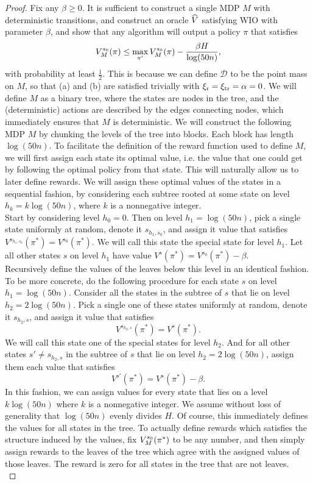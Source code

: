 \documentclass[11pt,twoside]{article}
\begin{document}
\noindent \begin{proof}
Fix any $\beta \geq 0$. It is sufficient to construct a single MDP $M$ with deterministic transitions, and construct an oracle $\widehat{V}$ satisfying WIO with parameter $\beta$, and show that any algorithm will output a policy $\pi$ that satisfies
$$
V^{{s_0 }}_{{M }}({\pi}) \leq \max_{\pi'} V^{{s_0 }}_{{M }}({\pi}) - \frac{\beta H}{\log(50n)},
$$
with probability at least $\frac{1}{2}$. This is because we can define $\mathcal{D}$ to be the point mass on $M$, so that \strprox{} (a) and (b) are satisfied trivially with $\operatorname{\xi_r} = \operatorname{\xi_{tr}} = \operatorname{\alpha} = 0$. We will define $M$ as a binary tree, where the states are nodes in the tree, and the (deterministic) actions are described by the edges connecting nodes, which immediately ensures that $M$ is deterministic. We will construct the following MDP $M$ by chunking the levels of the tree into blocks. Each block has length $\log(50n)$. To facilitate the definition of the reward function used to define $M$, we will first assign each state its optimal value, i.e. the value that one could get by following the optimal policy from that state. This will naturally allow us to later define rewards. We will assign these optimal values of the states in a sequential fashion, by considering each subtree rooted at some state on level $h_k = k \log(50n)$, where $k$ is a nonnegative integer. \\

\noindent Start by considering level $h_0 = 0$. Then on level $h_1 = \log(50n)$, pick a single state uniformly at random, denote it $s_{h_1, s_0}$, and assign it value that satisfies $V^{s_{h_1, s_0}}(\pi^*) = V^{s_0}(\pi^*)$. We will call this state the special state for level $h_1$. Let all other states $s$ on level $h_1$ have value $V^s(\pi^*) = V^{s_0}(\pi^*) - \beta$. \\

\noindent Recursively define the values of the leaves below this level in an identical fashion. To be more concrete, do the following procedure for each state $s$ on level $h_1 = \log(50n)$. Consider all the states in the subtree of $s$ that lie on level $h_2 = 2\log(50n)$. Pick a single one of these states uniformly at random, denote it $s_{h_2, s}$, and assign it value that satisfies
$$
V^{s_{h_2, s}}(\pi^*) = V^{s}(\pi^*).
$$
We will call this state one of the special states for level $h_2$. And for all other states $s' \neq s_{h_2, s}$ in the subtree of $s$ that lie on level $h_2 = 2\log(50n)$, assign them each value that satisfies
$$
V^{s'}(\pi^*) = V^{s}(\pi^*) - \beta.
$$
In this fashion, we can assign values for every state that lies on a level $k \log(50n)$ where $k$ is a nonnegative integer. We assume without loss of generality that $\log(50n)$ evenly divides $H$. Of course, this immediately defines the values for all states in the tree. To actually define rewards which satisfies the structure induced by the values, fix $V^{{s_0 }}_{{M }}({\pi^*})$ to be any number, and then simply assign rewards to the leaves of the tree which agree with the assigned values of those leaves. The reward is zero for all states in the tree that are not leaves. \\


\end{proof}
\end{document}
